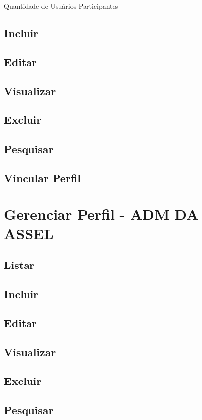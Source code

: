 	Quantidade de Usuários Participantes
	
		
	\subsection{Incluir}
	\subsection{Editar}
	\subsection{Visualizar}
	\subsection{Excluir}
	\subsection{Pesquisar}
	\subsection{Vincular Perfil}


\section{Gerenciar Perfil \msrls - ADM DA ASSEL}


	\subsection{Listar}
	\subsection{Incluir}
	\subsection{Editar}
	\subsection{Visualizar}
	\subsection{Excluir}
	\subsection{Pesquisar}


